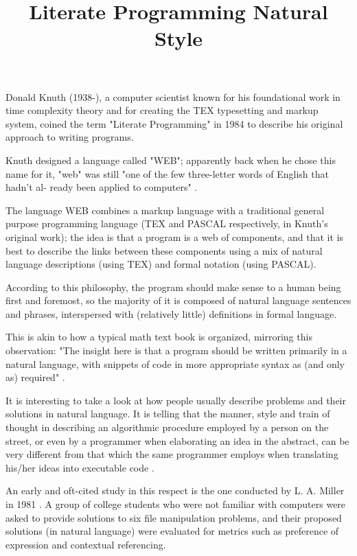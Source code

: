 \title{ Literate Programming}

Donald Knuth (1938-), a computer scientist known for his foundational work in time complexity theory and for creating the TEX typesetting and markup system, coined the term "Literate Programming" in 1984 to describe his original approach to writing programs.

Knuth designed a language called "WEB"; apparently back when he chose this name for it, "web" was still "one of the few three-letter words of English that hadn't al-
ready been applied to computers" \cite{knuth1984literate}.

The language WEB combines a markup language with a traditional general purpose programming language (TEX and PASCAL respectively, in Knuth's original work); the idea is that a program is a web of components, and that it is best to describe the links between these components using a mix of natural language descriptions (using TEX) and formal notation (using PASCAL).

According to this philosophy, the program should make sense to a human being first and foremost, so the majority of it is composed of natural language sentences and phrases, interspersed with (relatively little) definitions in formal language. 

This is akin to how a typical math text book is organized, mirroring this observation: "The insight here is that a program should be written primarily in a natural language, with snippets of code in more appropriate syntax as (and only as) required" \cite{osmosianblog}.

\title{ Natural Style}

It is interesting to take a look at how people usually describe problems and their solutions in natural language. It is telling that the manner, style and train of thought in describing an algorithmic procedure employed by a person on the street, or even by a programmer when elaborating an idea in the abstract, can be very different from that which the same programmer employs when translating his/her ideas into executable code  \cite{knoll2006pegasus, miller1981natural}.

An early and oft-cited study in this respect is the one conducted by L. A. Miller in 1981 \cite{miller1981natural}. A group of college students who were not familiar with computers were asked to provide solutions to six file manipulation problems, and their proposed solutions (in natural language) were evaluated for metrics such as preference of expression and contextual referencing.

